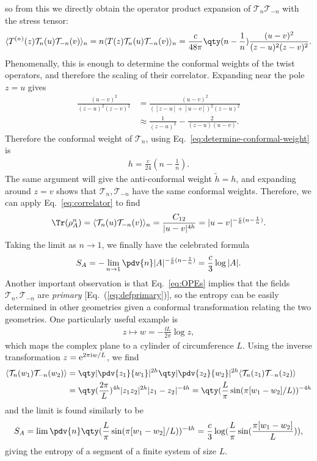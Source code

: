 so from this we directly obtain the operator product expansion of $\mathcal T_n
\mathcal T_{-n}$ with the stress tensor:
\begin{align}
\langle  T^{(n)}(z)\mathcal T_n(u)\mathcal T_{-n}(v) \rangle_{n} = n\langle T(z) \mathcal T_n(u)\mathcal T_{-n}(v)\rangle_{n} = \frac{c}{48\pi}\qty(n-\frac{1}{n})\frac{(u-v)^2}{(z-u)^2(z-v)^2}.\label{eq:OPEs}
\end{align}
Phenomenally, this is enough to determine the conformal weights of the twist
operators, and therefore the scaling of their correlator. Expanding near the
pole $z = u$ gives 
\begin{align}
\frac{(u-v)^2}{(z-u)^2(z-v)^2} &= 
  \frac{(u-v)^2}{([z-u]+[u-v])^2(z-u)^2} \\
  &\approx \frac{1}{(z-u)^2}-\frac{2}{(z-u)(u-v)}.
\end{align}
Therefore the conformal weight of $\mathcal T_n$, using Eq.~\eqref{eq:determine-conformal-weight} is
\begin{align}
h = \frac{c}{24}(n - \frac{1}{n}).
\end{align}
The same argument will give the anti-conformal weight $\tilde h = h$, and
expanding around $z = v$ shows that $\mathcal T_n, \mathcal T_{-n}$ have the
same conformal weights. Therefore, we can apply Eq.~\eqref{eq:correlator} to find
\begin{align}
\Tr(\rho_A^n) = \langle  \mathcal T_n(u) \mathcal T_{-n}(v)\rangle_{n} = \frac{C_{12}}{|u-v|^{4h}} = |u-v|^{-\frac{c}{6}(n-\frac{1}{n})}.
\end{align}
Taking the limit as $n \to 1$, we finally have the celebrated formula
\begin{align}
  S_A = -\lim_{n\to 1}\pdv{n} |A|^{-\frac{c}{6}(n-\frac{1}{n})} = \frac{c}{3}\log|A|.\label{eq:entropy_limit}
\end{align}
Another important observation is that Eq.~\eqref{eq:OPEs} implies that the
fields $\mathcal T_n, \mathcal T_{-n}$ are \emph{primary}
[Eq.~(\ref{eq:defprimary})], so the entropy can be easily determined in other
geometries given a conformal transformation relating the two geometries. One
particularly useful example is 
\begin{align}
z \mapsto w = -\frac{\ii L}{2\pi}\log z,
\end{align}
which maps the complex plane to a cylinder of circumference $L$. Using the
inverse transformation $z = \mathrm e^{2\pi \mathrm i w/L}$, we find
\begin{align}
  \langle  \mathcal T_n(w_1) \mathcal T_{-n}(w_2) \rangle &= \qty|\pdv{z_1}{w_1}|^{2h}\qty|\pdv{z_2}{w_2}|^{2h}\langle  \mathcal T_n(z_1)\mathcal T_{-n}(z_2) \rangle \\
  &= \qty(\frac{2\pi}{L})^{4h}|z_1z_2|^{2h}|z_1-z_2|^{-4h}
    = \qty(\frac{L}{\pi}\sin(\pi[w_1-w_2]/L))^{-4h}
\end{align}
and the limit is found similarly to be
\begin{align}
S_A = \lim \pdv{n}\qty(\frac{L}{\pi}\sin(\pi[w_1-w_2]/L))^{-4h} = \frac{c}{3}\log(\frac{L}{\pi}\sin(\frac{\pi[w_1 - w_2]}{L})),
\end{align}
giving the entropy of a segment of a finite system of size $L$.

